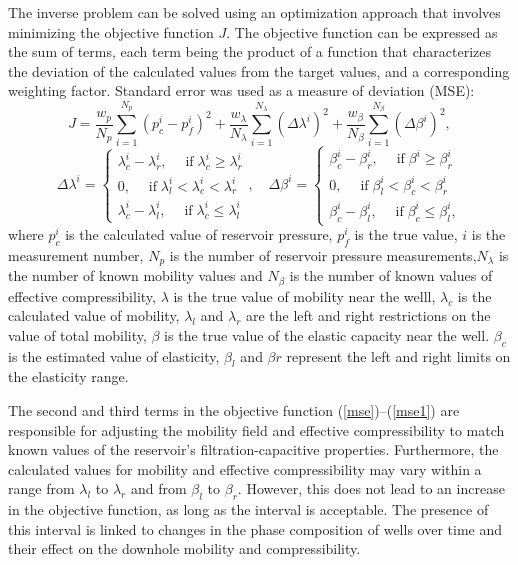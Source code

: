 \documentclass[
11pt,%
tightenlines,%
twoside,%
onecolumn,%
nofloats,%
nobibnotes,%
nofootinbib,%
superscriptaddress,%
noshowpacs,%
centertags]%
{revtex4}
\begin{document}
The inverse problem can be solved using an optimization approach that involves minimizing the objective function $J$.
The objective function can be expressed as the sum of terms, each term being the product of a function that characterizes the deviation of the calculated values from the target values, and a corresponding weighting factor. Standard error was used as a measure of deviation (MSE):
\begin{equation} \label{mse}
	J=\frac{w_p}{N_p}\sum_{i=1}^{N_p}{\left(p_c^i-p_f^i\right)^2}+
	\frac{w_{\lambda}}{N_\lambda}\sum_{i=1}^{N_\lambda}{\left(\Delta\lambda^i  \right)^2}+
	\frac{w_{\beta}}{N_\beta}\sum_{i=1}^{N_\beta}{\left(\Delta\beta^i  \right)^2},
\end{equation}
\begin{equation} \label{mse1}
	\Delta\lambda^i  = \left\{\begin{array}{crl}
		\lambda^i_c - \lambda^i_r, \quad \;\mbox{if}\; \lambda^i_c \ge \lambda^i_r\\
		0,\quad \;\mbox{if}\; \lambda^i_l < \lambda^i_c < \lambda^i_r\\
		\lambda^i_c - \lambda^i_l, \quad \;\mbox{if}\;\lambda^i_c \le \lambda^i_l
	\end{array}\right.,
	\quad
	\Delta\beta^i  = \left\{\begin{array}{crl}
		\beta^i_c - \beta^i_r, \quad \;\mbox{if}\; \beta^i \ge \beta^i_r\\
		0,\quad \;\mbox{if}\; \beta^i_l < \beta^i_c < \beta^i_r\\
		\beta^i_c - \beta^i_l, \quad \;\mbox{if}\;\beta^i_c \le \beta^i_l,
	\end{array}\right.
\end{equation}	
where $p_c^i$ is the calculated value of reservoir pressure, $p_f^i$
is the true value, $i$ is the measurement number, $N_p$ is the
number of reservoir pressure measurements,$N_\lambda$ is the
number of known mobility values and $N_\beta$ is the number of known values of effective compressibility, $\lambda$ is the true value of mobility near the welll, $\lambda_c$ is the calculated value of mobility, $\lambda_l$ and $\lambda_r$ are the left and right restrictions on the value of total mobility, $\beta$ is the true value of the elastic capacity near the well. $\beta_c$ is the estimated value of elasticity, $\beta_{l}$ and $\beta{r}$ represent the left and right limits on the elasticity range.

The second and third terms in the objective function ({\ref{mse}})--({\ref{mse1}}) are responsible for adjusting the mobility field and effective compressibility to match known values of the reservoir's filtration-capacitive properties. Furthermore, the calculated values for mobility and effective compressibility may vary within a range from $\lambda_l$ to $\lambda_r$ and from $\beta_l$ to $\beta_r$. However, this does not lead to an increase in the objective function, as long as the interval is acceptable. The presence of this interval is linked to changes in the phase composition of wells over time and their effect on the downhole mobility and compressibility.
\end{document}
